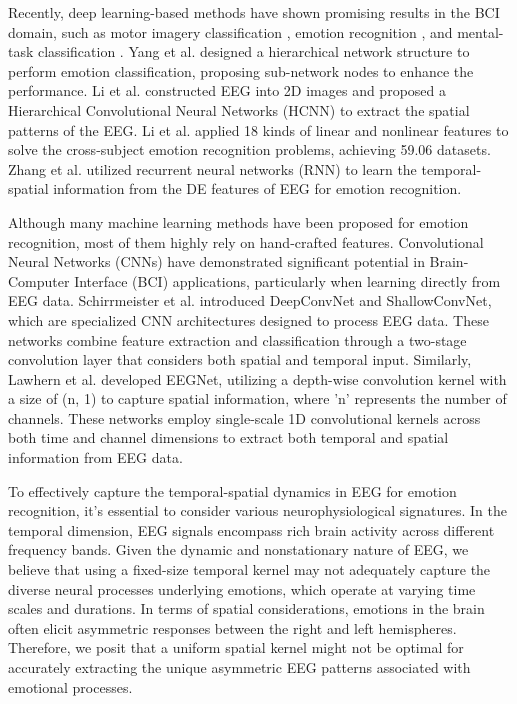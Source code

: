 Recently, deep learning-based methods have shown promising results
in the BCI domain, such as motor imagery classification , emotion recognition
, and mental-task classification . Yang
et al.  designed a hierarchical network structure to perform emotion classification, proposing sub-network nodes
to enhance the performance. Li et al. constructed EEG
into 2D images and proposed a Hierarchical Convolutional
Neural Networks (HCNN) to extract the spatial patterns of
the EEG. Li et al.  applied 18 kinds of linear and nonlinear features to solve the cross-subject emotion recognition problems, achieving 59.06%
datasets. Zhang et al.  utilized recurrent neural networks
(RNN) to learn the temporal-spatial information from the
DE features of EEG for emotion recognition.

Although many
machine learning methods have been proposed for emotion
recognition, most of them highly rely on hand-crafted features. Convolutional Neural Networks (CNNs) have demonstrated significant potential in Brain-Computer Interface (BCI) applications, particularly when learning directly from EEG data. Schirrmeister et al. introduced DeepConvNet and ShallowConvNet, which are specialized CNN architectures designed to process EEG data. These networks combine feature extraction and classification through a two-stage convolution layer that considers both spatial and temporal input. Similarly, Lawhern et al. developed EEGNet, utilizing a depth-wise convolution kernel with a size of (n, 1) to capture spatial information, where 'n' represents the number of channels. These networks employ single-scale 1D convolutional kernels across both time and channel dimensions to extract both temporal and spatial information from EEG data.

To effectively capture the temporal-spatial dynamics in EEG for emotion recognition, it's essential to consider various neurophysiological signatures. In the temporal dimension, EEG signals encompass rich brain activity across different frequency bands. Given the dynamic and nonstationary nature of EEG, we believe that using a fixed-size temporal kernel may not adequately capture the diverse neural processes underlying emotions, which operate at varying time scales and durations. In terms of spatial considerations, emotions in the brain often elicit asymmetric responses between the right and left hemispheres. Therefore, we posit that a uniform spatial kernel might not be optimal for accurately extracting the unique asymmetric EEG patterns associated with emotional processes.

